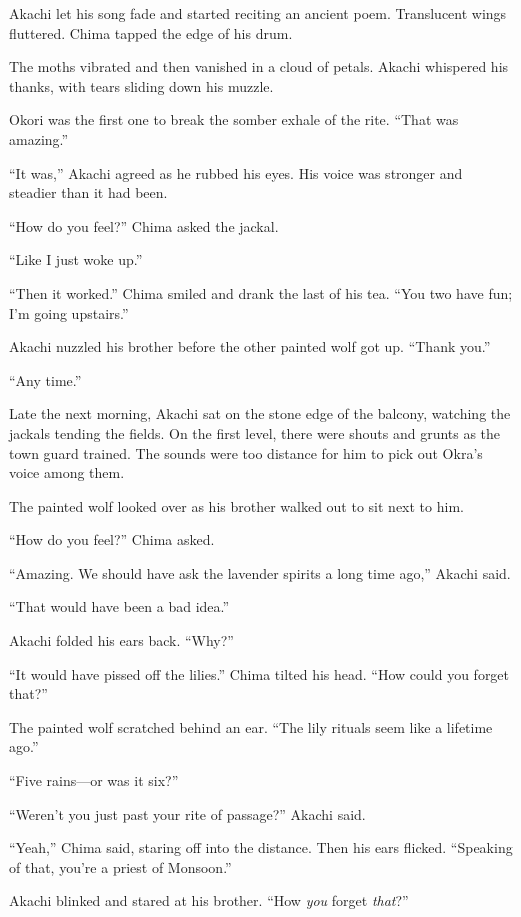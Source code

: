 Akachi let his song fade and started reciting an ancient poem. Translucent wings fluttered. Chima tapped the edge of his drum.

The moths vibrated and then vanished in a cloud of petals. Akachi whispered his thanks, with tears sliding down his muzzle.

Okori was the first one to break the somber exhale of the rite. ``That was amazing.''

``It was,'' Akachi agreed as he rubbed his eyes. His voice was stronger and steadier than it had been.

``How do you feel?'' Chima asked the jackal.

``Like I just woke up.''

``Then it worked.'' Chima smiled and drank the last of his tea. ``You two have fun; I'm going upstairs.''

Akachi nuzzled his brother before the other painted wolf got up. ``Thank you.''

``Any time.''

\secdiv

\noindent Late the next morning, Akachi sat on the stone edge of the balcony, watching the jackals tending the fields. On the first level, there were shouts and grunts as the town guard trained. The sounds were too distance for him to pick out Okra's voice among them.

The painted wolf looked over as his brother walked out to sit next to him.

``How do you feel?'' Chima asked.

``Amazing. We should have ask the lavender spirits a long time ago,'' Akachi said.

``That would have been a bad idea.''

Akachi folded his ears back. ``Why?''

``It would have pissed off the lilies.'' Chima tilted his head. ``How could you forget that?''

The painted wolf scratched behind an ear. ``The lily rituals seem like a lifetime ago.''

``Five rains---or was it six?''

``Weren't you just past your rite of passage?'' Akachi said.

``Yeah,'' Chima said, staring off into the distance. Then his ears flicked. ``Speaking of that, you're a priest of Monsoon.''

Akachi blinked and stared at his brother. ``How \emph{you} forget \emph{that}?''

